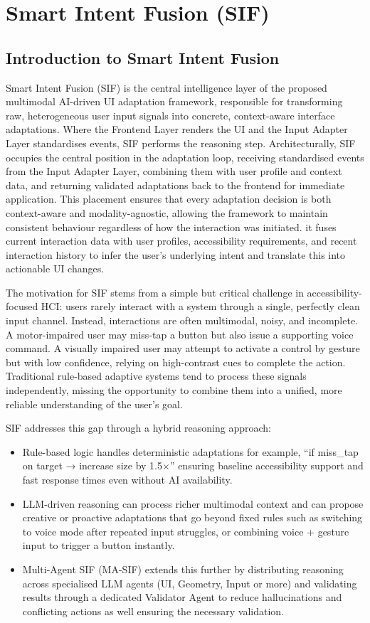 \documentclass[openany]{book}
\begin{document}
\chapter{Smart Intent Fusion (SIF)}
\label{ch:chapter4}
\section{Introduction to Smart Intent Fusion}
Smart Intent Fusion (SIF) is the central intelligence layer of the proposed multimodal AI-driven UI adaptation framework, responsible for transforming raw, heterogeneous user input signals into concrete, context-aware interface adaptations. 
Where the Frontend Layer renders the UI and the Input Adapter Layer standardises events, SIF performs the reasoning step. Architecturally, SIF occupies the central position in the adaptation loop, receiving standardised events from the Input Adapter Layer, combining them with user profile and context data, and returning validated adaptations back to the frontend for immediate application. This placement ensures that every adaptation decision is both context-aware and modality-agnostic, allowing the framework to maintain consistent behaviour regardless of how the interaction was initiated.
it fuses current interaction data with user profiles, accessibility requirements, and recent interaction history to infer the user’s underlying intent and translate this into actionable UI changes.

The motivation for SIF stems from a simple but critical challenge in accessibility-focused HCI:
users rarely interact with a system through a single, perfectly clean input channel. Instead, interactions are often multimodal, noisy, and incomplete. A motor-impaired user may miss-tap a button but also issue a supporting voice command. A visually impaired user may attempt to activate a control by gesture but with low confidence, relying on high-contrast cues to complete the action. Traditional rule-based adaptive systems tend to process these signals independently, missing the opportunity to combine them into a unified, more reliable understanding of the user’s goal.

SIF addresses this gap through a hybrid reasoning approach:
\begin{itemize}
    \item Rule-based logic handles deterministic adaptations for example, “if miss\_tap on target → increase size by 1.5×” ensuring baseline accessibility support and fast response times even without AI availability.
    \item LLM-driven reasoning can process richer multimodal context and can propose creative or proactive adaptations that go beyond fixed rules such as switching to voice mode after repeated input struggles, or combining voice + gesture input to trigger a button instantly.
    \item Multi-Agent SIF (MA-SIF) extends this further by distributing reasoning across specialised LLM agents (UI, Geometry, Input or more) and validating results through a dedicated Validator Agent to reduce hallucinations and conflicting actions as well ensuring the necessary validation.
\end{itemize}
\end{document}

